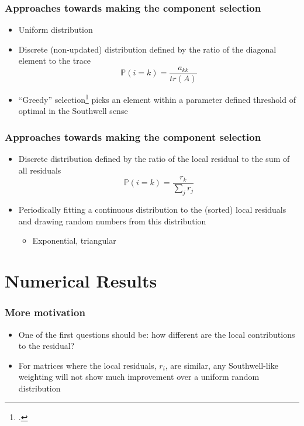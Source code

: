 \documentclass{beamer}
\begin{document}
\begin{frame}
	\frametitle{Approaches towards making the component selection}
	    \begin{itemize}
	        \item Uniform distribution
	        \item Discrete (non-updated) distribution defined by the ratio of the diagonal element to the trace
	            \begin{equation}
	                \mathbb{P}(i=k) = \frac{a_{kk}}{tr(A)}
	            \end{equation}
	        \item ``Greedy'' selection\footcite{griebel2012greedy} picks an element within a parameter defined threshold of optimal in the Southwell sense 
	    \end{itemize}
\end{frame}


\begin{frame}
	\frametitle{Approaches towards making the component selection}
	    \begin{itemize}
	        \item Discrete distribution defined by the ratio of the local residual to the sum of all residuals
	            \begin{equation}
	                \mathbb{P}(i=k) = \frac{r_{k}}{\sum_j r_j}
	            \end{equation}
	        \item Periodically fitting a continuous distribution to the (sorted) local residuals and drawing random numbers from this distribution
	            \begin{itemize}
	                \item Exponential, triangular
	            \end{itemize}
	    \end{itemize}
\end{frame}

\section{Numerical Results}

\begin{frame}
	\frametitle{More motivation}
	\begin{itemize}
		\item One of the first questions should be: how different are the local contributions to the residual?
		\item For matrices where the local residuals, $r_i$, are similar, any Southwell-like weighting will not show much improvement over a uniform random distribution
	\end{itemize}
\end{frame}
\end{document}
